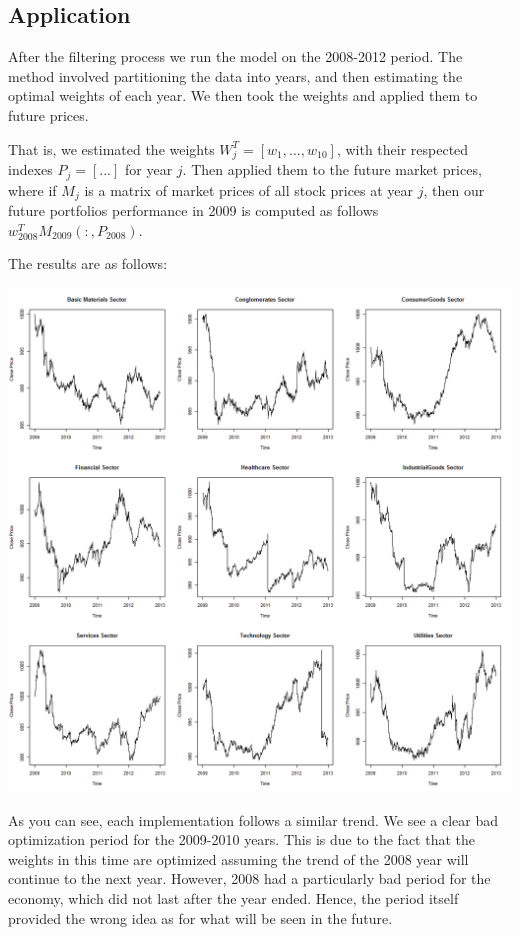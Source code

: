 \documentclass[12pt,titlepage,letter]{article}
\begin{document}
	\subsection{Application}
	After the filtering process we run the model on the 2008-2012 period. The method involved partitioning the data into years, and then estimating the optimal weights of each year. We then took the weights and applied them to future prices.

	That is, we estimated the weights \(W^T_j = [w_1,...,w_{10}]\), with their respected indexes \(P_j = [...]\) for year \(j\). Then applied them to the future market prices, where if \(M_{j}\) is a matrix of market prices of all stock prices at year \(j\), then our future portfolios performance in 2009 is computed as follows \(w^T_{2008}M_{2009}(:,P_{2008})\).

	The results are as follows:
	\begin{center}
		\includegraphics[width=7in]{plots-historical.png}
	\end{center}
	As you can see, each implementation follows a similar trend. We see a clear bad optimization period for the 2009-2010 years. This is due to the fact that the weights in this time are optimized assuming the trend of the 2008 year will continue to the next year. However, 2008 had a particularly bad period for the economy, which did not last after the year ended. Hence, the period itself provided the wrong idea as for what will be seen in the future.
\end{document}
